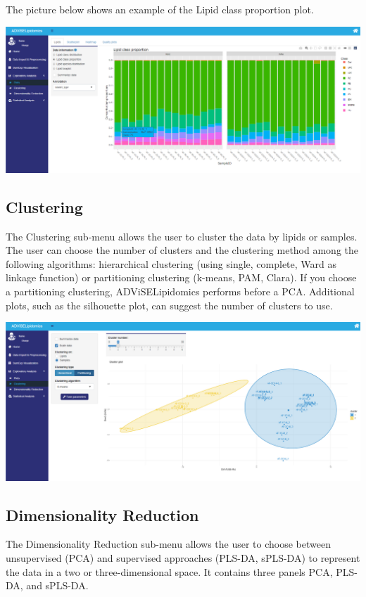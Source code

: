 \documentclass[
]{book}
\begin{document}
The picture below shows an example of the Lipid class proportion plot.

\includegraphics[width=1\linewidth]{images/taxabarplot}

\hypertarget{sec342}{%
\subsection{Clustering}\label{sec342}}

The Clustering sub-menu allows the user to cluster the data by lipids or samples. The user can choose the number of clusters and the clustering method among the following algorithms: hierarchical clustering (using single, complete, Ward as linkage function) or partitioning clustering (k-means, PAM, Clara). If you choose a partitioning clustering, ADViSELipidomics performs before a PCA. Additional plots, such as the silhouette plot, can suggest the number of clusters to use.

\includegraphics[width=1\linewidth]{images/clustering}

\hypertarget{sec343}{%
\subsection{Dimensionality Reduction}\label{sec343}}

The Dimensionality Reduction sub-menu allows the user to choose between unsupervised (PCA) and supervised approaches (PLS-DA, sPLS-DA) to represent the data in a two or three-dimensional space. It contains three panels PCA, PLS-DA, and sPLS-DA.
\end{document}
